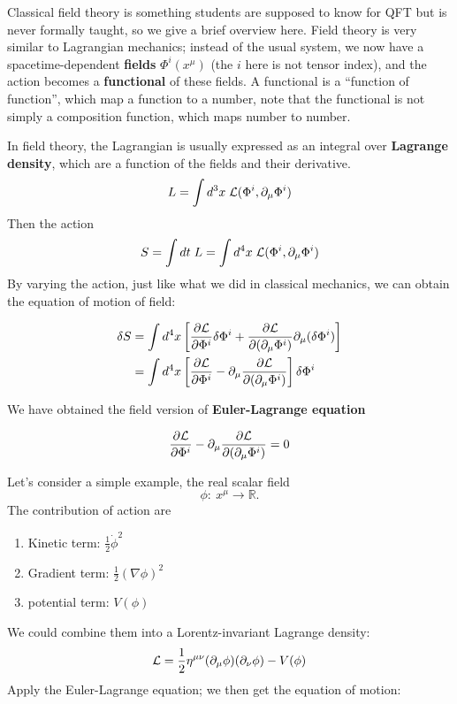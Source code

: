 \documentclass[../QFTCS_note.tex]{subfiles}
\numberwithin{equation}{subsection}
\begin{document}
Classical field theory is something students are supposed to know for QFT but is never formally taught, so we give a brief overview here.
Field theory is very similar to Lagrangian mechanics; instead of the usual system,
we now have a spacetime-dependent \textbf{fields} \(\Phi^i(x^\mu)\) (the \(i\) here is not tensor index),
and the action becomes a \textbf{functional} of these fields. A functional is a ``function of function'', which map a function to a number,
note that the functional is not simply a composition function, which maps number to number. \par
In field theory, the Lagrangian is usually expressed as an integral over \textbf{Lagrange density},
which are a function of the fields and their derivative.
\begin{equation}
  L=\int d^3x\;\mathcal{L}(\Phi^i,\partial_{\mu}\Phi^i)
\end{equation}
Then the action
\begin{equation}
  S=\int dt\;L = \int d^4x\;\mathcal{L}(\Phi^i,\partial_{\mu}\Phi^i)
\end{equation}
By varying the action, just like what we did in classical mechanics, we can obtain the equation of motion of field:

\begin{align}
  \delta S & = \int d^4x\left[\frac{\partial\mathcal{L}}{\partial \Phi^i}\delta\Phi^i+
  \frac{\partial\mathcal{L}}{\partial(\partial_\mu \Phi^i)}\partial_\mu (\delta\Phi^i)\right]      \\
           & =\int d^4x\left[\frac{\partial\mathcal{L}}{\partial \Phi^i}-\partial_\mu
    \frac{\partial\mathcal{L}}{\partial(\partial_\mu \Phi^i)}\right]\delta\Phi^i
\end{align}

We have obtained the field version of \textbf{Euler-Lagrange equation}
\begin{definition}
  \[\frac{\partial\mathcal{L}}{\partial \Phi^i}-\partial_\mu
    \frac{\partial\mathcal{L}}{\partial(\partial_\mu \Phi^i)}=0\]
\end{definition}
Let's consider a simple example, the real scalar field \[\phi:\ x^{\mu} \rightarrow \mathbb{R}.\]
The contribution of action are

\begin{enumerate}
  \item Kinetic term: \(\frac{1}{2}\dot{\phi}^2\)
  \item Gradient term: \(\frac{1}{2}(\nabla\phi)^2\)
  \item potential term: \(V(\phi)\)
\end{enumerate}
We could combine them into a Lorentz-invariant Lagrange density:
\begin{equation}
  \mathcal{L}= \frac{1}{2}\eta^{\mu\nu}(\partial_{\mu}\phi)(\partial_{\nu}\phi)-V(\phi)
\end{equation}
Apply the Euler-Lagrange equation; we then get the equation of motion:
\end{document}
